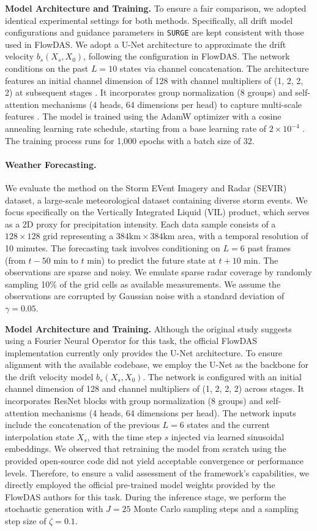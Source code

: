 \documentclass{article}
\theoremstyle{plain}
\theoremstyle{definition}
\theoremstyle{remark}
\begin{document}
\textbf{Model Architecture and Training.} To ensure a fair comparison, we adopted identical experimental settings for both methods. Specifically, all drift model configurations and guidance parameters in \texttt{SURGE} are kept consistent with those used in FlowDAS. We adopt a U-Net architecture to approximate the drift velocity $b_s(X_s, X_0)$, following the configuration in FlowDAS. The network conditions on the past $L=10$ states via channel concatenation. The architecture features an initial channel dimension of 128 with channel multipliers of (1, 2, 2, 2) at subsequent stages . It incorporates group normalization (8 groups) and self-attention mechanisms (4 heads, 64 dimensions per head) to capture multi-scale features . The model is trained using the AdamW optimizer with a cosine annealing learning rate schedule, starting from a base learning rate of $2\times 10^{-4}$ . The training process runs for 1,000 epochs with a batch size of 32.
\paragraph{Weather Forecasting.}
We evaluate the method on the Storm EVent Imagery and Radar (SEVIR) dataset, a large-scale meteorological dataset containing diverse storm events. We focus specifically on the Vertically Integrated Liquid (VIL) product, which serves as a 2D proxy for precipitation intensity. Each data sample consists of a $128 \times 128$ grid representing a $384 \text{km} \times 384 \text{km}$ area, with a temporal resolution of 10 minutes. The forecasting task involves conditioning on $L=6$ past frames (from $t-50$ min to $t$ min) to predict the future state at $t+10$ min. The observations are sparse and noisy. We emulate sparse radar coverage by randomly sampling 10\% of the grid cells as available measurements. We assume the observations are corrupted by Gaussian noise with a standard deviation of $\gamma=0.05$.

\textbf{Model Architecture and Training.} Although the original study suggests using a Fourier Neural Operator for this task, the official FlowDAS implementation currently only provides the U-Net architecture. To ensure alignment with the available codebase, we employ the U-Net as the backbone for the drift velocity model $b_s(X_s, X_0)$. The network is configured with an initial channel dimension of 128 and channel multipliers of (1, 2, 2, 2) across stages. It incorporates ResNet blocks with group normalization (8 groups) and self-attention mechanisms (4 heads, 64 dimensions per head). The network inputs include the concatenation of the previous $L=6$ states and the current interpolation state $X_s$, with the time step $s$ injected via learned sinusoidal embeddings. We observed that retraining the model from scratch using the provided open-source code did not yield acceptable convergence or performance levels. Therefore, to ensure a valid assessment of the framework's capabilities, we directly employed the official pre-trained model weights provided by the FlowDAS authors for this task. During the inference stage, we perform the stochastic generation with $J=25$ Monte Carlo sampling steps and a sampling step size of $\zeta=0.1$. 
\end{document}
